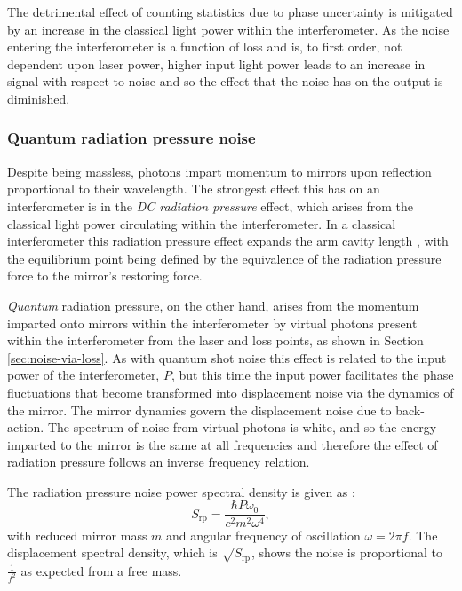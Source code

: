 The detrimental effect of counting statistics due to phase uncertainty is mitigated by an increase in the classical light power within the interferometer. As the noise entering the interferometer is a function of loss and is, to first order, not dependent upon laser power, higher input light power leads to an increase in signal with respect to noise and so the effect that the noise has on the output is diminished.

\subsubsection{\label{sec:quantum-rp-noise}Quantum radiation pressure noise}
Despite being massless, photons impart momentum to mirrors upon reflection proportional to their wavelength. The strongest effect this has on an interferometer is in the \emph{\gls{DC} radiation pressure} effect, which arises from the classical light power circulating within the interferometer. In a classical interferometer this radiation pressure effect expands the arm cavity length , with the equilibrium point being defined by the equivalence of the radiation pressure force to the mirror's restoring force.

\emph{Quantum} radiation pressure, on the other hand, arises from the momentum imparted onto mirrors within the interferometer by virtual photons present within the interferometer from the laser and loss points, as shown in Section\,\ref{sec:noise-via-loss}. As with quantum shot noise this effect is related to the input power of the interferometer, $P$, but this time the input power facilitates the phase fluctuations that become transformed into displacement noise via the dynamics of the mirror. The mirror dynamics govern the displacement noise due to back-action. The spectrum of noise from virtual photons is white, and so the energy imparted to the mirror is the same at all frequencies and therefore the effect of radiation pressure follows an inverse frequency relation.

The radiation pressure noise power spectral density is given as \cite{Danilishin2012}:
\begin{equation}
  \label{eq:rp-noise-psd}
  S_{\text{rp}} = \frac{\hbar P \omega_0}{c^2 m^2 \omega^4},
\end{equation}
with reduced mirror mass $m$ and angular frequency of oscillation $\omega = 2 \pi f$. The displacement spectral density, which is $\sqrt{S_{\text{rp}}}$, shows the noise is proportional to $\frac{1}{f^2}$ as expected from a free mass.

